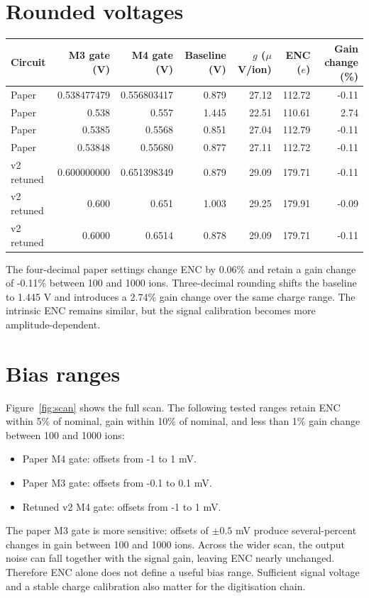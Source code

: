 \documentclass[11pt,a4paper]{article}
\begin{document}
\section*{Rounded voltages}
\begin{center}\small\begin{tabular}{lrrrrrr}\toprule
Circuit & M3 gate (V) & M4 gate (V) & Baseline (V) & $g$ ($\mu$V/ion) & ENC ($e$) & Gain change (\%)\\\midrule
Paper & 0.538477479 & 0.556803417 & 0.879 & 27.12 & 112.72 & -0.11 \\
Paper & 0.538 & 0.557 & 1.445 & 22.51 & 110.61 & 2.74 \\
Paper & 0.5385 & 0.5568 & 0.851 & 27.04 & 112.79 & -0.11 \\
Paper & 0.53848 & 0.55680 & 0.877 & 27.11 & 112.72 & -0.11 \\
v2 retuned & 0.600000000 & 0.651398349 & 0.879 & 29.09 & 179.71 & -0.11 \\
v2 retuned & 0.600 & 0.651 & 1.003 & 29.25 & 179.91 & -0.09 \\
v2 retuned & 0.6000 & 0.6514 & 0.878 & 29.09 & 179.71 & -0.11 \\
\bottomrule\end{tabular}\end{center}

The four-decimal paper settings change ENC by 0.06\% and retain
a gain change of -0.11\% between 100 and 1000 ions. Three-decimal
rounding shifts the baseline to 1.445 V and introduces a
2.74\% gain change over the same charge range. The intrinsic ENC
remains similar, but the signal calibration becomes more amplitude-dependent.

\section*{Bias ranges}
Figure~\ref{fig:scan} shows the full scan. The following tested ranges
retain ENC within 5\% of nominal, gain within 10\% of nominal, and less
than 1\% gain change between 100 and 1000 ions:
\begin{itemize}
\item Paper M4 gate: offsets from -1 to 1 mV.
\item Paper M3 gate: offsets from -0.1 to 0.1 mV.
\item Retuned v2 M4 gate: offsets from -1 to 1 mV.
\end{itemize}
The paper M3 gate is more sensitive: offsets of $\pm0.5$ mV produce
several-percent changes in gain between 100 and 1000 ions. Across the wider
scan, the output noise can fall together with the signal gain, leaving ENC
nearly unchanged. Therefore ENC alone does not define a useful bias range.
Sufficient signal voltage and a stable charge calibration also matter for
the digitisation chain.
\end{document}

